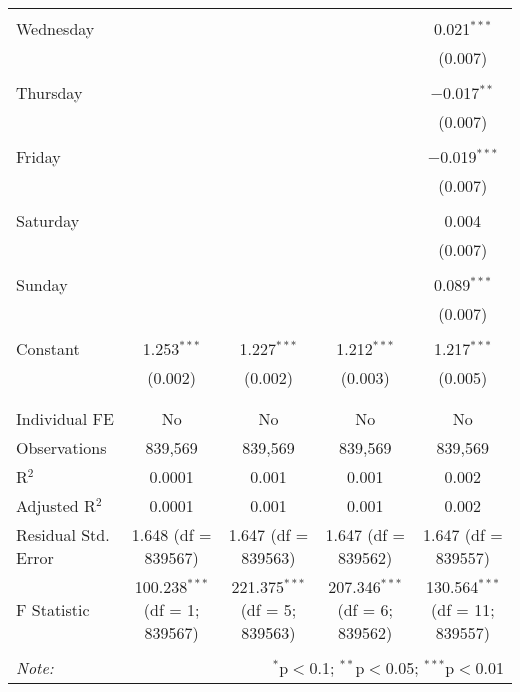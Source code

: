 \documentclass[
]{article}
\begin{document}
\begin{table}[!htbp]
{\begin{tabular}{@{\extracolsep{5pt}}lcccc}
  & & & & \\ 
 Wednesday &  &  &  & 0.021$^{***}$ \\ 
  &  &  &  & (0.007) \\ 
  & & & & \\ 
 Thursday &  &  &  & $-$0.017$^{**}$ \\ 
  &  &  &  & (0.007) \\ 
  & & & & \\ 
 Friday &  &  &  & $-$0.019$^{***}$ \\ 
  &  &  &  & (0.007) \\ 
  & & & & \\ 
 Saturday &  &  &  & 0.004 \\ 
  &  &  &  & (0.007) \\ 
  & & & & \\ 
 Sunday &  &  &  & 0.089$^{***}$ \\ 
  &  &  &  & (0.007) \\ 
  & & & & \\ 
 Constant & 1.253$^{***}$ & 1.227$^{***}$ & 1.212$^{***}$ & 1.217$^{***}$ \\ 
  & (0.002) & (0.002) & (0.003) & (0.005) \\ 
  & & & & \\ 
\hline \\[-1.8ex] 
Individual FE & No & No & No & No \\ 
Observations & 839,569 & 839,569 & 839,569 & 839,569 \\ 
R$^{2}$ & 0.0001 & 0.001 & 0.001 & 0.002 \\ 
Adjusted R$^{2}$ & 0.0001 & 0.001 & 0.001 & 0.002 \\ 
Residual Std. Error & 1.648 (df = 839567) & 1.647 (df = 839563) & 1.647 (df = 839562) & 1.647 (df = 839557) \\ 
F Statistic & 100.238$^{***}$ (df = 1; 839567) & 221.375$^{***}$ (df = 5; 839563) & 207.346$^{***}$ (df = 6; 839562) & 130.564$^{***}$ (df = 11; 839557) \\ 
\hline 
\hline \\[-1.8ex] 
\textit{Note:}  & \multicolumn{4}{r}{$^{*}$p$<$0.1; $^{**}$p$<$0.05; $^{***}$p$<$0.01} \\ 
\end{tabular}
} 
\end{table} 
\newpage
\end{document}

